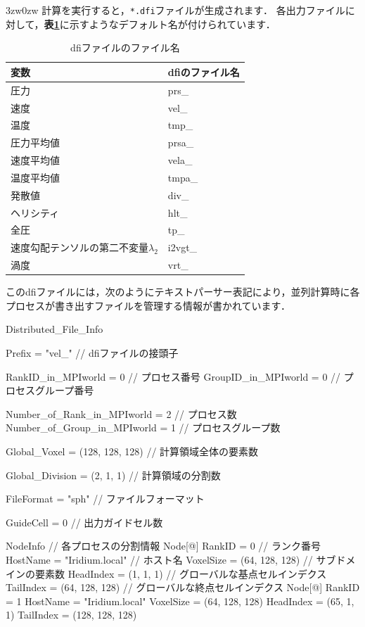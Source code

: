 \begin{indentation}{3zw}{0zw}
計算を実行すると，\verb|*.dfi|ファイルが生成されます．
各出力ファイルに対して，\textbf{表\ref{tbl:dfi}}に示すようなデフォルト名が付けられています．

\begin{table}[htdp]
\caption{dfiファイルのファイル名}
\begin{center}
\small
\begin{tabular}{ll} \toprule
変数 & dfiのファイル名 \\ \midrule
圧力 & prs\_\\
速度 & vel\_\\
温度 & tmp\_\\
圧力平均値 & prsa\_\\
速度平均値 & vela\_\\
温度平均値 & tmpa\_\\
発散値 & div\_\\
ヘリシティ & hlt\_\\
全圧 & tp\_\\
速度勾配テンソルの第二不変量$\lambda_2$ & i2vgt\_\\
渦度 & vrt\_\\ \bottomrule
\end{tabular}
\end{center}
\label{tbl:dfi}
\end{table}

このdfiファイルには，次のようにテキストパーサー表記により，並列計算時に各プロセスが書き出すファイルを管理する情報が書かれています．

{\small
\begin{program}
Distributed_File_Info {

  Prefix = "vel_"                 // dfiファイルの接頭子

  RankID_in_MPIworld  = 0         // プロセス番号
  GroupID_in_MPIworld = 0         // プロセスグループ番号

  Number_of_Rank_in_MPIworld  = 2 // プロセス数
  Number_of_Group_in_MPIworld = 1 // プロセスグループ数

  Global_Voxel = (128, 128, 128)  // 計算領域全体の要素数

  Global_Division = (2, 1, 1)     // 計算領域の分割数

  FileFormat = "sph"              // ファイルフォーマット

  GuideCell = 0                   // 出力ガイドセル数

  NodeInfo {                      // 各プロセスの分割情報
    Node[@] {
      RankID    = 0               // ランク番号
      HostName  = "Iridium.local" // ホスト名
      VoxelSize = (64, 128, 128)  // サブドメインの要素数
      HeadIndex = (1, 1, 1)       // グローバルな基点セルインデクス
      TailIndex = (64, 128, 128)  // グローバルな終点セルインデクス
    }
    Node[@] {
      RankID    = 1
      HostName  = "Iridium.local"
      VoxelSize = (64, 128, 128)
      HeadIndex = (65, 1, 1)
      TailIndex = (128, 128, 128)
    }
  }

}
\end{program}}
\end{indentation}

